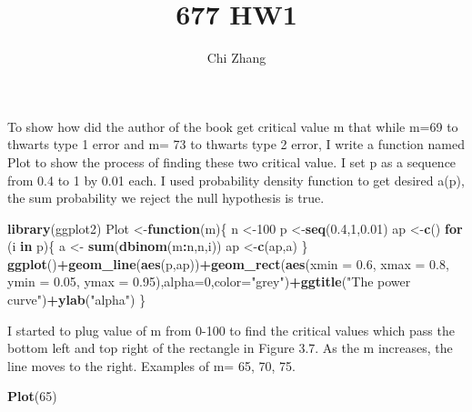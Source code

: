 \documentclass[
]{article}
\title{677 HW1}
\author{Chi Zhang}
\date{}
\newenvironment{Shaded}{\begin{snugshade}}{\end{snugshade}}
\newcommand{\ControlFlowTok}[1]{\textcolor[rgb]{0.13,0.29,0.53}{\textbf{#1}}}
\newcommand{\DataTypeTok}[1]{\textcolor[rgb]{0.13,0.29,0.53}{#1}}
\newcommand{\DecValTok}[1]{\textcolor[rgb]{0.00,0.00,0.81}{#1}}
\newcommand{\FloatTok}[1]{\textcolor[rgb]{0.00,0.00,0.81}{#1}}
\newcommand{\KeywordTok}[1]{\textcolor[rgb]{0.13,0.29,0.53}{\textbf{#1}}}
\newcommand{\NormalTok}[1]{#1}
\newcommand{\OperatorTok}[1]{\textcolor[rgb]{0.81,0.36,0.00}{\textbf{#1}}}
\newcommand{\StringTok}[1]{\textcolor[rgb]{0.31,0.60,0.02}{#1}}
\begin{document}
\maketitle

To show how did the author of the book get critical value m that while
m=69 to thwarts type 1 error and m= 73 to thwarts type 2 error, I write
a function named Plot to show the process of finding these two critical
value. I set p as a sequence from 0.4 to 1 by 0.01 each. I used
probability density function to get desired a(p), the sum probability we
reject the null hypothesis is true.

\begin{Shaded}
\begin{Highlighting}[]
\KeywordTok{library}\NormalTok{(ggplot2)}
\NormalTok{Plot <-}\ControlFlowTok{function}\NormalTok{(m)\{}
\NormalTok{n <-}\DecValTok{100}
\NormalTok{p <-}\KeywordTok{seq}\NormalTok{(}\FloatTok{0.4}\NormalTok{,}\DecValTok{1}\NormalTok{,}\FloatTok{0.01}\NormalTok{)}
\NormalTok{ap <-}\KeywordTok{c}\NormalTok{()}
\ControlFlowTok{for}\NormalTok{ (i }\ControlFlowTok{in}\NormalTok{ p)\{}
\NormalTok{  a <-}\StringTok{ }\KeywordTok{sum}\NormalTok{(}\KeywordTok{dbinom}\NormalTok{(m}\OperatorTok{:}\NormalTok{n,n,i))}
\NormalTok{  ap <-}\KeywordTok{c}\NormalTok{(ap,a)}
\NormalTok{\}}
\KeywordTok{ggplot}\NormalTok{()}\OperatorTok{+}\KeywordTok{geom_line}\NormalTok{(}\KeywordTok{aes}\NormalTok{(p,ap))}\OperatorTok{+}\KeywordTok{geom_rect}\NormalTok{(}\KeywordTok{aes}\NormalTok{(}\DataTypeTok{xmin =} \FloatTok{0.6}\NormalTok{, }\DataTypeTok{xmax =} \FloatTok{0.8}\NormalTok{, }\DataTypeTok{ymin =} \FloatTok{0.05}\NormalTok{, }\DataTypeTok{ymax =} \FloatTok{0.95}\NormalTok{),}\DataTypeTok{alpha=}\DecValTok{0}\NormalTok{,}\DataTypeTok{color=}\StringTok{"grey"}\NormalTok{)}\OperatorTok{+}\KeywordTok{ggtitle}\NormalTok{(}\StringTok{"The power curve"}\NormalTok{)}\OperatorTok{+}\KeywordTok{ylab}\NormalTok{(}\StringTok{"alpha"}\NormalTok{)}
\NormalTok{\}}
\end{Highlighting}
\end{Shaded}

I started to plug value of m from 0-100 to find the critical values
which pass the bottom left and top right of the rectangle in Figure 3.7.
As the m increases, the line moves to the right. Examples of m= 65, 70,
75.

\begin{Shaded}
\begin{Highlighting}[]
\KeywordTok{Plot}\NormalTok{(}\DecValTok{65}\NormalTok{)}
\end{Highlighting}
\end{Shaded}
\end{document}
